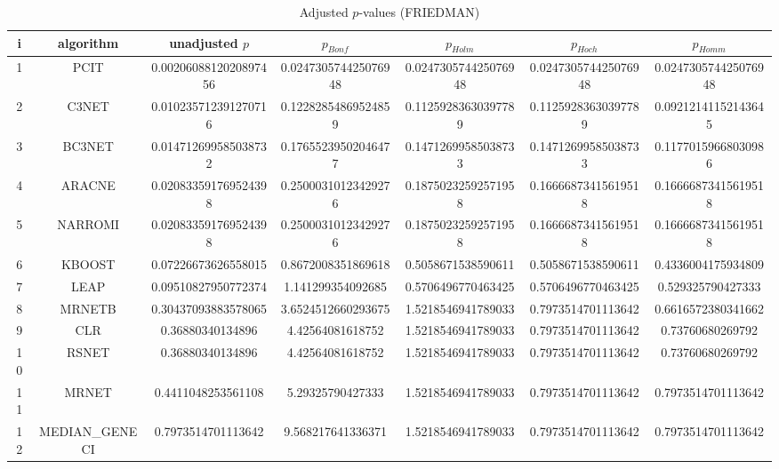 \documentclass[a4paper,10pt]{article}
\begin{document}
\begin{landscape}
\begin{table}[!htp]
\centering\scriptsize
\caption{Adjusted $p$-values (FRIEDMAN)}
\begin{tabular}{ccccccc}
i&algorithm&unadjusted $p$&$p_{Bonf}$&$p_{Holm}$&$p_{Hoch}$&$p_{Homm}$\\
\hline
1&PCIT&0.0020608812020897456&0.024730574425076948&0.024730574425076948&0.024730574425076948&0.024730574425076948\\
2&C3NET&0.010235712391270716&0.12282854869524859&0.11259283630397789&0.11259283630397789&0.09212141152143645\\
3&BC3NET&0.014712699585038732&0.17655239502046477&0.14712699585038733&0.14712699585038733&0.11770159668030986\\
4&ARACNE&0.020833591769524398&0.25000310123429276&0.18750232592571958&0.16666873415619518&0.16666873415619518\\
5&NARROMI&0.020833591769524398&0.25000310123429276&0.18750232592571958&0.16666873415619518&0.16666873415619518\\
6&KBOOST&0.07226673626558015&0.8672008351869618&0.5058671538590611&0.5058671538590611&0.4336004175934809\\
7&LEAP&0.09510827950772374&1.141299354092685&0.5706496770463425&0.5706496770463425&0.529325790427333\\
8&MRNETB&0.30437093883578065&3.6524512660293675&1.5218546941789033&0.7973514701113642&0.6616572380341662\\
9&CLR&0.36880340134896&4.42564081618752&1.5218546941789033&0.7973514701113642&0.73760680269792\\
10&RSNET&0.36880340134896&4.42564081618752&1.5218546941789033&0.7973514701113642&0.73760680269792\\
11&MRNET&0.4411048253561108&5.29325790427333&1.5218546941789033&0.7973514701113642&0.7973514701113642\\
12&MEDIAN_GENECI&0.7973514701113642&9.568217641336371&1.5218546941789033&0.7973514701113642&0.7973514701113642\\
\hline
\end{tabular}
\end{table}


\end{landscape}
\end{document}
